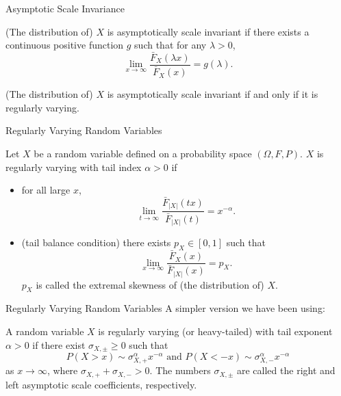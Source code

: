 \documentclass{beamer}
\begin{document}
\begin{frame}{Asymptotic Scale Invariance}
    \begin{definition}
        (The distribution of) $X$ is asymptotically scale invariant if there exists a continuous positive function $g$ such that for any $\lambda > 0$,
        \[
        \lim_{x \to \infty} \frac{\bar{F}_X(\lambda x)}{\bar{F}_X(x)} = g(\lambda).
        \]
    \end{definition}
    \begin{theorem}
        (The distribution of) $X$ is asymptotically scale invariant if and only if it is regularly varying.
    \end{theorem}
\end{frame}

\begin{frame}{Regularly Varying Random Variables}
    \begin{definition}
        Let $X$ be a random variable defined on a probability space $(\Omega, F, P)$. $X$ is regularly varying with tail index $\alpha > 0$ if
        \begin{itemize}
            \item for all large $x$,
            \[
            \lim_{t \to \infty} \frac{\bar{F}_{|X|}(t x)}{\bar{F}_{|X|}(t)} = x^{-\alpha}.
            \]
            \item (tail balance condition) there exists $p_X \in [0, 1]$ such that
            \[
            \lim_{x \to \infty} \frac{\bar{F}_X(x)}{\bar{F}_{|X|}(x)} = p_X.
            \]
            $p_X$ is called the extremal skewness of (the distribution of) $X$.
        \end{itemize}
    \end{definition}
\end{frame}

\begin{frame}{Regularly Varying Random Variables}
    A simpler version we have been using:
    \begin{definition}
        A random variable $X$ is regularly varying (or heavy-tailed) with tail exponent $\alpha > 0$ if there exist $\sigma_{X, \pm} \ge 0$ such that
        \begin{equation*}\label{eq:tail_conds}
            P(X > x) \sim \sigma_{X, +}^{\alpha}x^{-\alpha} \text{ and } P(X < -x) \sim \sigma_{X, -}^{\alpha}x^{-\alpha}
        \end{equation*}
        as $x \to \infty$, where $\sigma_{X, +} + \sigma_{X, -} > 0$. The numbers $\sigma_{X, \pm}$ are called the right and left asymptotic scale coefficients, respectively.
    \end{definition}
\end{frame}
\end{document}
